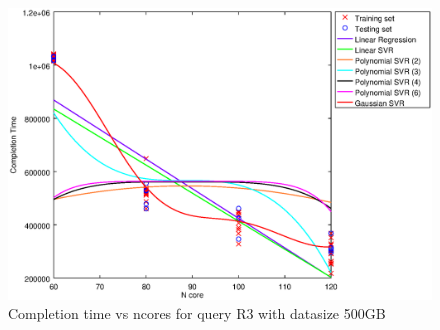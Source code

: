 
\begin {figure}[hbtp]
\centering
\includegraphics[width=\textwidth]{output/R3_500_ONLY_1_LINEAR_NCORE/plot_R3_500.eps}
\caption{Completion time vs ncores for query R3 with datasize 500GB}
\label{fig:only_1_linear_R3_500}
\end {figure}
